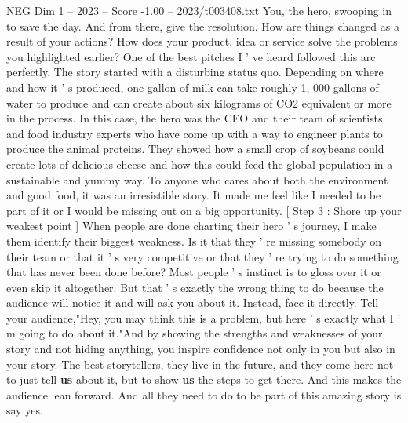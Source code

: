 \begin{textsample}{NEG Dim 1 – 2023 – Score -1.00 – 2023/t003408.txt}
You, the hero, swooping in to save the day.
And from there, give the resolution.
How are things changed as a result of your actions?
How does your product, idea or service solve the problems you highlighted earlier?
One of the best pitches I ' ve heard followed this arc perfectly.
The story started with a disturbing status quo.
Depending on where and how it ' s produced, one gallon of milk can take roughly 1, 000 gallons of water to produce and can create about six kilograms of CO2 equivalent or more in the process.
In this case, the hero was the CEO and their team of scientists and food industry experts who have come up with a way to engineer plants to produce the animal proteins.
They showed how a small crop of soybeans could create lots of delicious cheese and how this could feed the global population in a sustainable and yummy way.
To anyone who cares about both the environment and good food, it was an irresistible story.
It made me feel like I needed to be part of it or I would be missing out on a big opportunity. [ Step 3 : Shore up your weakest point ] When people are done charting their hero ' s journey, I make them identify their biggest weakness.
Is it that they ' re missing somebody on their team or that it ' s very competitive or that they ' re trying to do something that has never been done before?
Most people ' s instinct is to gloss over it or even skip it altogether.
But that ' s exactly the wrong thing to do because the audience will notice it and will ask you about it.
Instead, face it directly.
Tell your audience,"Hey, you may think this is a problem, but here ' s exactly what I ' m going to do about it."And by showing the strengths and weaknesses of your story and not hiding anything, you inspire confidence not only in you but also in your story.
The best storytellers, they live in the future, and they come here not to just tell \textbf{us} about it, but to show \textbf{us} the steps to get there.
And this makes the audience lean forward.
And all they need to do to be part of this amazing story is say yes.

\end{textsample}
